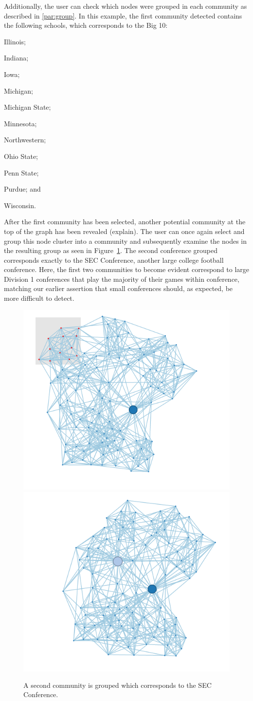 \documentclass{article}\usepackage[]{graphicx}\usepackage[]{color}
\newcommand{\ak}[1]{{\color{blue} #1}}
\begin{document}
Additionally, the user can check which nodes were grouped in each community as described in \ref{par:group}. In this example, the first community detected contains the following schools, which corresponds to the Big 10:\begin{inparaenum}
\item Illinois;
\item Indiana; 
\item Iowa; 
\item Michigan; 
\item Michigan State; 
\item Minnesota; 
\item Northwestern; 
\item Ohio State; 
\item Penn State;
\item Purdue; and
\item Wisconsin.
\end{inparaenum}

After the first community has been selected, another potential community at the top of the graph has been revealed \ak{(explain)}. The user can once again select and group this node cluster into a community and subsequently examine the nodes in the resulting group as seen in Figure~\ref{fig:football_6}. The second conference grouped corresponds exactly to the SEC Conference, another large college football conference. Here, the first two communities to become evident correspond to large Division 1 conferences that play the majority of their games within conference, matching our earlier assertion that small conferences should, as expected, be more difficult to detect.

\begin{figure}[H]
\centering
\includegraphics[width=.49\textwidth]{images/football_45.png}
\includegraphics[width=.49\textwidth]{images/football_6.png}
\caption{\label{fig:football_6} A second community is grouped which corresponds to the SEC Conference.}
\end{figure}
\end{document}
